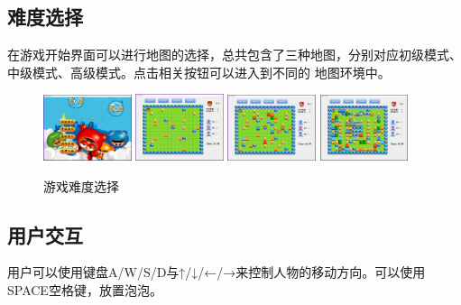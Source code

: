 \documentclass[UTF8, a4paper]{ctexart}
\begin{document}
 \subsection{难度选择}
 在游戏开始界面可以进行地图的选择，总共包含了三种地图，分别对应初级模式、中级模式、高级模式。点击相关按钮可以进入到不同的
 地图环境中。
\begin{figure}[h]
    \centering
        {\includegraphics[width=0.23\textwidth]{start.png}}
    \hspace{0.01\textwidth}
        {\includegraphics[width=0.23\textwidth]{primary.png}}
    \hspace{0.01\textwidth}
        {\includegraphics[width=0.23\textwidth]{middle.png}}
    \hspace{0.01\textwidth}
        {\includegraphics[width=0.23\textwidth]{advanced.png}}
    \caption{游戏难度选择}
    \label{fig:gameSetup}
  \end{figure}

\subsection{用户交互}
用户可以使用键盘A/W/S/D与↑/↓/←/→来控制人物的移动方向。可以使用SPACE空格键，放置泡泡。 
\end{document}
